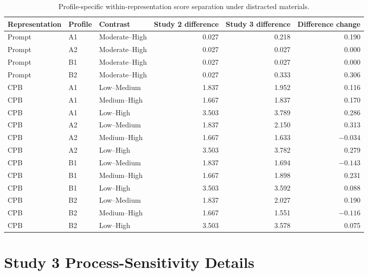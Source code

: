 \begin{table}[H]
\centering
\caption[Profile-specific score separation in Study 3.]{Profile-specific within-representation score separation under distracted materials.}
\label{tab:appendix-study3-score-separation}
\scriptsize
\setlength{\tabcolsep}{4pt}
\renewcommand{\arraystretch}{1.1}
\begin{tabular*}{\textwidth}{@{\extracolsep{\fill}}lllrrr@{}}
\toprule
\textbf{Representation} & \textbf{Profile} & \textbf{Contrast} & \textbf{Study 2 difference} & \textbf{Study 3 difference} & \textbf{Difference change} \\
\midrule
Prompt & A1 & Moderate--High & 0.027 & 0.218 & 0.190 \\
Prompt & A2 & Moderate--High & 0.027 & 0.027 & 0.000 \\
Prompt & B1 & Moderate--High & 0.027 & 0.027 & 0.000 \\
Prompt & B2 & Moderate--High & 0.027 & 0.333 & 0.306 \\
CPB & A1 & Low--Medium & 1.837 & 1.952 & 0.116 \\
CPB & A1 & Medium--High & 1.667 & 1.837 & 0.170 \\
CPB & A1 & Low--High & 3.503 & 3.789 & 0.286 \\
CPB & A2 & Low--Medium & 1.837 & 2.150 & 0.313 \\
CPB & A2 & Medium--High & 1.667 & 1.633 & $-0.034$ \\
CPB & A2 & Low--High & 3.503 & 3.782 & 0.279 \\
CPB & B1 & Low--Medium & 1.837 & 1.694 & $-0.143$ \\
CPB & B1 & Medium--High & 1.667 & 1.898 & 0.231 \\
CPB & B1 & Low--High & 3.503 & 3.592 & 0.088 \\
CPB & B2 & Low--Medium & 1.837 & 2.027 & 0.190 \\
CPB & B2 & Medium--High & 1.667 & 1.551 & $-0.116$ \\
CPB & B2 & Low--High & 3.503 & 3.578 & 0.075 \\
\bottomrule
\end{tabular*}
\end{table}

\section{Study 3 Process-Sensitivity Details}
\label{appendix:study3-process-sensitivity}

